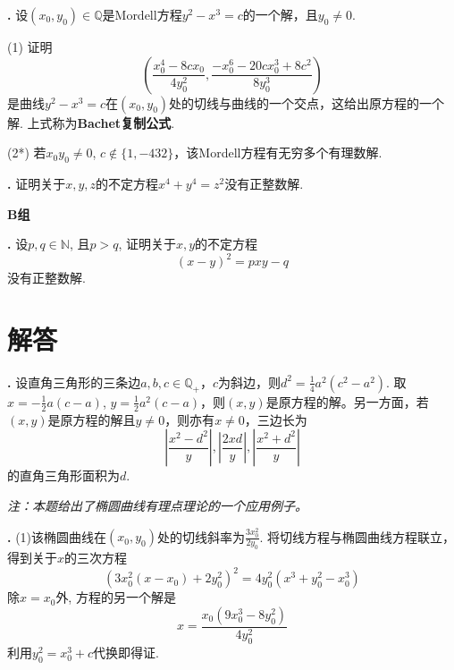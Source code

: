 \par \textbf{\theprobdio .} \cite{RPEC}
设$(x_0,y_0)\in \mathbb{Q}$是Mordell方程$y^2-x^3=c$的一个解，且$y_0\neq 0$. 
\par (1) 证明
\begin{equation}
    \left(\frac{x_0^4-8 c x_0}{4 y_0^2}, \frac{-x_0^6-20 c x_0^3+8 c^2}{8 y_0^3}\right)
\end{equation}
是曲线$y^2-x^3=c$在$(x_0,y_0)$处的切线与曲线的一个交点，这给出原方程的一个解. 上式称为\textbf{Bachet复制公式}.
\par (2*) 若$x_0y_0\neq 0$, $c\notin \{1, -432\}$，该Mordell方程有无穷多个有理数解.

\par \textbf{\theprobdio .} 证明关于$x,y,z$的不定方程$x^4+y^4=z^2$没有正整数解. 

\par \textbf{B组}

\par \textbf{\theprobdio .} \cite{SMI} 设$p,q\in \mathbb{N}$, 且$p>q$, 证明关于$x,y$的不定方程
\begin{equation}
    (x-y)^2=pxy-q
\end{equation}
没有正整数解. 

\section*{解答}
\par \textbf{\thesoldio .} \cite{MiP} 设直角三角形的三条边$a,b,c\in \mathbb{Q}_+$，$c$为斜边，则$d^2=\frac{1}{4}a^2(c^2-a^2)$. 取$x=-\frac{1}{2}a(c-a)$, $y=\frac{1}{2}a^2(c-a)$，则$(x,y)$是原方程的解。另一方面，若$(x,y)$是原方程的解且$y\neq 0$，则亦有$x\neq 0$，三边长为
\begin{displaymath}
\left\vert \frac{x^2-d^2}{y}\right\vert, \left\vert \frac{2xd}{y}\right\vert, \left\vert \frac{x^2+d^2}{y}\right\vert
\end{displaymath}
的直角三角形面积为$d$.
\par \emph{注：本题给出了椭圆曲线有理点理论的一个应用例子。}

\par \textbf{\thesoldio .} 
(1)该椭圆曲线在$(x_0,y_0)$处的切线斜率为$\frac{3x_0^2}{2y_0}$. 将切线方程与椭圆曲线方程联立，得到关于$x$的三次方程
\begin{equation}
    \left(3x_0^2(x-x_0)+2y_0^2\right)^2=4y_0^2(x^3+y_0^2-x_0^3)
\end{equation}
除$x=x_0$外, 方程的另一个解是
\begin{equation}
    x=\frac{x_0(9x_0^3-8y_0^2)}{4y_0^2}
\end{equation}
利用$y_0^2=x_0^3+c$代换即得证. 


